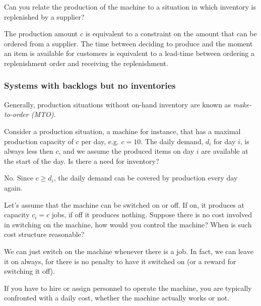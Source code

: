 \begin{exercise}
  Can you relate the production of the machine to a situation in which
  inventory is replenished by a supplier?

  \begin{solution}
    The production amount $c$ is equivalent to a constraint on the
    amount that can be ordered from a supplier. The time between
    deciding to produce and the moment an item is available for
    customers is equivalent to a lead-time between ordering a
    replenishment order and receiving the replenishment.
  \end{solution}
\end{exercise}


\subsubsection{Systems with backlogs but no inventories}

Generally, production situations without on-hand inventory are known as \emph{make-to-order (MTO)}.

\begin{exercise}\label{ex:2}
  Consider a production situation, a machine for instance, that has a
 maximal production capacity of $c$ per day, e.g. $c=10$.  The daily demand,
  $d_i$ for day $i$, is always less then $c$, and we assume the
  produced items on day $i$ are available at the start of the day. Is
  there a need for inventory?


  \begin{solution}
No. Since $c\geq d_i$, the daily demand can be covered by production every day again.     
  \end{solution}
\end{exercise}

\begin{exercise}
  Let's assume that the machine can be switched on or off.  If on, it
  produces at capacity $c_i=c$ jobs, if off it produces nothing.  Suppose there is no cost involved in switching on the machine, how would you control the   machine?
When is such cost structure reasonable?
  \begin{solution}
    We can just switch on the machine whenever there is a job. In
    fact, we can leave it on always, for there is no penalty to have
    it switched on (or a reward for switching it off).


    If you have to hire or assign personnel to operate the machine, you
    are typically confronted with a daily cost, whether the machine
    actually works or not.
  \end{solution}
\end{exercise}


